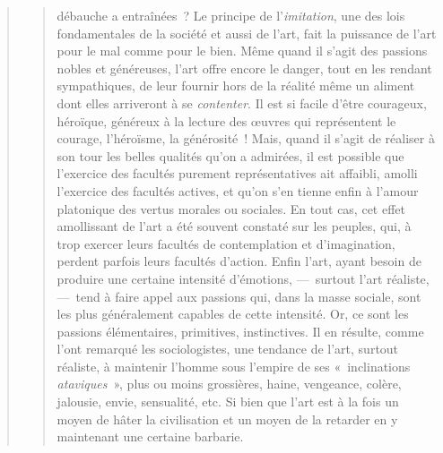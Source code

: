 \documentclass[french,twoside]{book} %
\begin{document}
\begin{verse}
\begin{verse}
débauche a entraînées ? Le principe de l’\emph{imitation}, une des lois fondamentales de la société et aussi de l’art, fait la puissance de l’art pour le mal comme pour le bien. Même quand il s’agit des passions nobles et généreuses, l’art offre encore le danger, tout en les rendant sympathiques, de leur fournir hors de la réalité même un aliment dont elles arriveront à se \emph{contenter}. Il est si facile d’être courageux, héroïque, généreux à la lecture des œuvres qui représentent le courage, l’héroïsme, la générosité ! Mais, quand il s’agit de réaliser à son tour les belles qualités qu’on a admirées, il est possible que l’exercice des facultés purement représentatives ait affaibli, amolli l’exercice des facultés actives, et qu’on s’en tienne enfin à l’amour platonique des vertus morales ou sociales. En tout cas, cet effet amollissant de l’art a été souvent constaté sur les peuples, qui, à trop exercer leurs facultés de contemplation et d’imagination, perdent parfois leurs facultés d’action. Enfin l’art, ayant besoin de produire une certaine intensité d’émotions, — surtout l’art réaliste, — tend à faire appel aux passions qui, dans la masse sociale, sont les plus généralement capables de cette intensité. Or, ce sont les passions élémentaires, primitives, instinctives. Il en résulte, comme l’ont remarqué les sociologistes, une tendance de l’art, surtout réaliste, à maintenir l’homme sous l’empire de ses « inclinations \emph{ataviques} », plus ou moins grossières, haine, vengeance, colère, jalousie, envie, sensualité, etc. Si bien que l’art est à la fois un moyen de hâter la civilisation et un moyen de la retarder en y maintenant une certaine barbarie.\par

\end{verse}
\end{verse}
\end{document}
